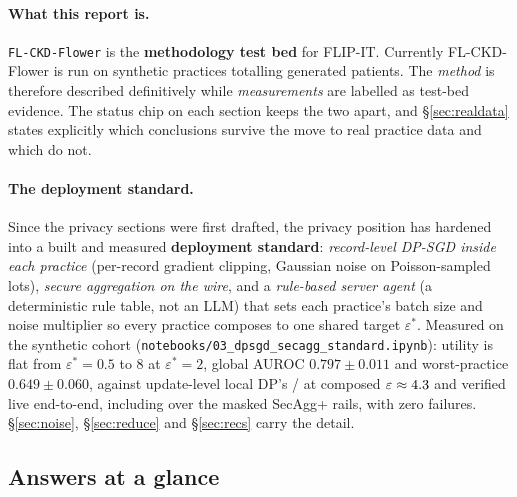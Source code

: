 \paragraph{What this report is.} \texttt{FL-CKD-Flower} is the \textbf{methodology test bed} for
FLIP-IT. Currently FL-CKD-Flower is run on \NumPractices{} synthetic practices totalling
\NumPatients{} generated patients. The \emph{method} is therefore described definitively while
\emph{measurements} are labelled as test-bed evidence. The status chip on each section keeps the
two apart, and \S\ref{sec:realdata} states explicitly which conclusions survive the move to real
practice data and which do not.

\paragraph{The deployment standard.} Since the privacy sections were first drafted, the privacy
position has hardened into a built and measured \textbf{deployment standard}: \emph{record-level
DP-SGD inside each practice} (per-record gradient clipping, Gaussian noise on Poisson-sampled lots),
\emph{secure aggregation on the wire}, and a \emph{rule-based server agent} (a deterministic rule
table, not an LLM) that sets each practice's batch size and noise multiplier so every practice
composes to one shared target $\varepsilon^{*}$. Measured on the synthetic cohort
(\texttt{notebooks/03\_dpsgd\_secagg\_standard.ipynb}): utility is flat from
$\varepsilon^{*} = 0.5$ to $8$ at $\varepsilon^{*} = 2$, global AUROC $0.797 \pm 0.011$ and
worst-practice $0.649 \pm 0.060$, against update-level local DP's \LocalAUCOne{} /
\LocalWorstOne{} at composed
$\varepsilon \approx 4.3{}$ and verified live end-to-end, including over the masked SecAgg+ rails,
with zero failures. \S\ref{sec:noise}, \S\ref{sec:reduce} and \S\ref{sec:recs} carry the detail.

\subsection*{Answers at a glance}

